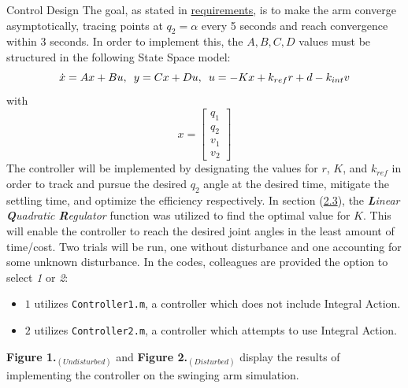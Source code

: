 \documentclass[12pt]{article}
\begin{document}
\begin{section}{Control Design}
The goal, as stated in \hyperref[req]{requirements}, is to make the arm converge asymptotically, tracing points at $q_2 = \hyperref[alpha]{\alpha}$ every 5 seconds and reach convergence within 3 seconds.  In order to implement this, the $A,B,C,D$ values must be structured in the following State Space model:
\[
    \dot{x} = Ax + Bu , \enspace
    y = Cx + Du, \enspace \\
    u = -Kx + k_{ref}r + d - k_{int} v
\]
with
\[
    x =
    \begin{bmatrix}
        q_1 \\ q_2 \\ v_1 \\ v_2
    \end{bmatrix}
\]
The controller will be implemented by designating the values for $r$, $K$, and $k_{ref}$ in order to track and pursue the desired $q_2$ angle at the desired time, mitigate the settling time, and optimize the efficiency respectively.  In section (\hyperref[sec:2.3]{2.3}), the \emph{\textbf{L}inear \textbf{Q}uadratic \textbf{R}egulator} function was utilized to find the optimal value for $K$.  This will enable the controller to reach the desired joint angles in the least amount of time/cost.  Two trials will be run, one without disturbance and one accounting for some unknown disturbance.  In the codes, colleagues are provided the option to select \emph{1} or \emph{2}:
\begin{itemize}
    \item $1$ utilizes \lstinline{Controller1.m}, a controller which does not include Integral Action.
    \item $2$ utilizes \lstinline{Controller2.m}, a controller which attempts to use Integral Action.
\end{itemize}
\textbf{Figure 1.}$_{(Undisturbed)}$ and \textbf{Figure 2.}$_{(Disturbed)}$ display the results of implementing the controller on the swinging arm simulation.


\end{section}
\end{document}
